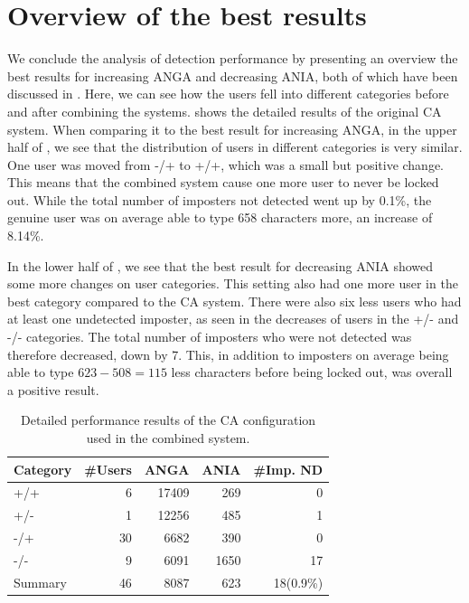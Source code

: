 \section{Overview of the best results}
\label{sec:analysis-overview-best-results}
We conclude the analysis of detection performance by presenting an overview the best results for increasing ANGA and decreasing ANIA, both of which have been discussed in .
Here, we can see how the users fell into different categories before and after combining the systems.
 shows the detailed results of the original CA system.
When comparing it to the best result for increasing ANGA, in the upper half of , we see that the distribution of users in different categories is very similar.
One user was moved from -/+ to +/+, which was a small but positive change.
This means that the combined system cause one more user to never be locked out.
While the total number of imposters not detected went up by 0.1\%, the genuine user was on average able to type 658 characters more, an increase of 8.14\%.

In the lower half of , we see that the best result for decreasing ANIA showed some more changes on user categories.
This setting also had one more user in the best category compared to the CA system.
There were also six less users who had at least one undetected imposter, as seen in the decreases of users in the +/- and -/- categories.
The total number of imposters who were not detected was therefore decreased, down by 7.
This, in addition to imposters on average being able to type $\text{623}-\text{508} = 115$ less characters before being locked out, was overall a positive result.

\begin{table}[ht]
\centering
\begin{tabular}{lrrrr}
\hline
\textit{} Category & \#Users & ANGA & ANIA & \#Imp. ND \\ \hline
+/+ & 6  & 17409 & 269  & 0  \\
+/- & 1  & 12256 & 485  & 1  \\
-/+ & 30 & 6682  & 390  & 0  \\
-/- & 9  & 6091  & 1650 & 17 \\ \hline
Summary & 46 & 8087  & 623  & 18(0.9\%) \\ \hline
\end{tabular}
\caption{Detailed performance results of the CA configuration used in the combined system.}
\label{tab:CA-detailed-performance}
\end{table}

